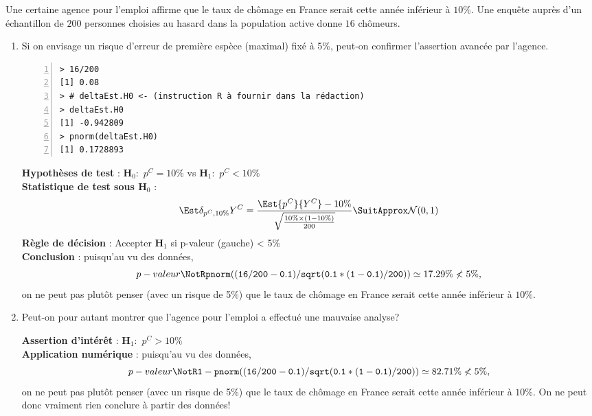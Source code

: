 \documentclass[10pt]{report}
\begin{document}
\bigskip

\begin{exercice}
Une certaine agence pour l'emploi affirme que le taux de
chômage en France serait cette année inférieur à $10\%$. Une
enquête auprès d'un échantillon de $200$ personnes choisies au hasard
dans la population active donne $16$ chômeurs.
\begin{enumerate}
\item Si on envisage un risque d'erreur de première 
espèce 
(maximal) 
fixé à 5\%, peut-on confirmer l'assertion avancée par l'agence.\\
\IndicR
\begin{Verbatim}[frame=leftline,fontfamily=tt,fontshape=n,numbers=left]
> 16/200
[1] 0.08
> # deltaEst.H0 <- (instruction R à fournir dans la rédaction)
> deltaEst.H0
[1] -0.942809
> pnorm(deltaEst.H0)
[1] 0.1728893
\end{Verbatim}

\begin{Correction}

\noindent \textbf{Hypothèses de test} : $\mathbf{H}_0:$ $p^{C}=10\%$ vs {\large $\mathbf{H}_1:$ $p^{C}<10\%$}\\
\textbf{Statistique de test sous $\mathbf{H}_0$} :
  $$
  \Est{\delta_{p^{C},10\%}}{Y^{C}}= {\displaystyle \frac{\Est{p^{C}}{Y^{C}}-10\%}{
\sqrt{\frac{10\%\times (1-10\%)} {200}}
}} 
  \SuitApprox \mathcal{N}(0,1)
  $$
\textbf{Règle de décision} : Accepter $\mathbf{H}_1$ si 
  p-valeur (gauche) < 5\%\\
\noindent \textbf{Conclusion} :
puisqu'au vu des données, 
  \[
p-valeur\NotR\mathtt{pnorm((16/200-0.1)/sqrt(0.1*(1-0.1)/200))} \simeq 17.29\%\nless5\%,
\]
on ne peut pas plutôt penser (avec un risque de 5\%) que le taux de chômage en France serait cette année inférieur à $10\%$.
\end{Correction}
\item Peut-on pour autant montrer que l'agence pour 
l'emploi a effectué une mauvaise analyse?
 

\begin{Correction}

\noindent \textbf{Assertion d'intérêt} :  $\mathbf{H}_1:$ $p^{C}>10\%$ \\
\textbf{Application numérique} :  puisqu'au vu des données, 
  \[
p-valeur\NotR\mathtt{1-pnorm((16/200-0.1)/sqrt(0.1*(1-0.1)/200))} \simeq 82.71\%\nless5\%,
\]
on ne peut pas plutôt penser (avec un risque de 5\%) que le taux de chômage en France serait cette année inférieur à $10\%$.
On ne peut donc vraiment rien conclure à partir des données!
\end{Correction}

\end{enumerate}
\end{exercice}
\end{document}
